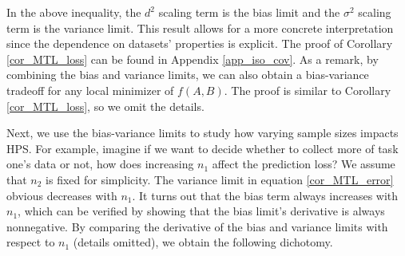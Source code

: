 

In the above inequality, the $d^2$ scaling term is the bias limit and the $\sigma^2$ scaling term is the variance limit.
This result allows for a more concrete interpretation since the dependence on datasets' properties is explicit.
The proof of Corollary \ref{cor_MTL_loss} can be found in Appendix \ref{app_iso_cov}.
As a remark, %
by combining the bias and variance limits, we can also obtain a bias-variance tradeoff for any local minimizer of $f(A, B)$.
The proof is similar to Corollary \ref{cor_MTL_loss}, so we omit the details.

Next, we use the bias-variance limits to study how varying sample sizes impacts HPS.
For example, imagine if we want to decide whether to collect more of task one's data or not, how does increasing $n_1$ affect the prediction loss?
We assume that $n_2$ is fixed for simplicity.
The variance limit in equation \eqref{cor_MTL_error} obvious decreases with $n_1$.
It turns out that the bias term always increases with $n_1$, which can be verified by showing that the bias limit's derivative is always nonnegative.
By comparing the derivative of the bias and variance limits with respect to $n_1$ (details omitted), we obtain the following dichotomy.

